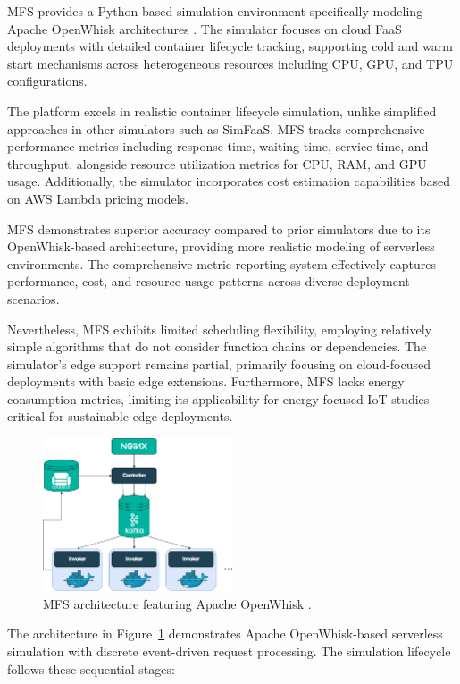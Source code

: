 MFS provides a Python-based simulation environment specifically modeling Apache OpenWhisk architectures \cite{bermbach2019mfs}. The simulator focuses on cloud FaaS deployments with detailed container lifecycle tracking, supporting cold and warm start mechanisms across heterogeneous resources including CPU, GPU, and TPU configurations.

The platform excels in realistic container lifecycle simulation, unlike simplified approaches in other simulators such as SimFaaS. MFS tracks comprehensive performance metrics including response time, waiting time, service time, and throughput, alongside resource utilization metrics for CPU, RAM, and GPU usage. Additionally, the simulator incorporates cost estimation capabilities based on AWS Lambda pricing models.

MFS demonstrates superior accuracy compared to prior simulators due to its OpenWhisk-based architecture, providing more realistic modeling of serverless environments. The comprehensive metric reporting system effectively captures performance, cost, and resource usage patterns across diverse deployment scenarios.

Nevertheless, MFS exhibits limited scheduling flexibility, employing relatively simple algorithms that do not consider function chains or dependencies. The simulator's edge support remains partial, primarily focusing on cloud-focused deployments with basic edge extensions. Furthermore, MFS lacks energy consumption metrics, limiting its applicability for energy-focused IoT studies critical for sustainable edge deployments.

\begin{figure}[htbp]
\centering
\includegraphics[width=0.5\textwidth]{assets/Apache OpenWhisk architecture.png}
\caption{MFS architecture featuring Apache OpenWhisk \cite{bermbach2019mfs, banaei2022etas}.}
\label{fig:mfs-architecture}
\end{figure}

The architecture in Figure~\ref{fig:mfs-architecture} demonstrates Apache OpenWhisk-based serverless simulation with discrete event-driven request processing. The simulation lifecycle follows these sequential stages:

